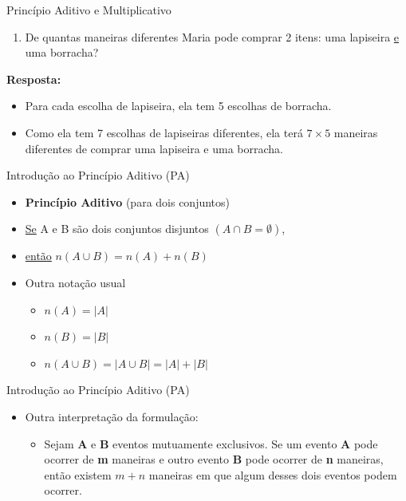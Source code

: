 \documentclass[aspectratio=169]{beamer}
\begin{document}
\begin{frame}{Princípio Aditivo e Multiplicativo}
     \begin{enumerate}[b]
        \item De quantas maneiras diferentes Maria pode comprar 2 itens: uma  lapiseira \underline{e} uma borracha?
    \end{enumerate}
    
    \vspace{4mm}
    \textbf{Resposta:}
    
    \begin{itemize}
        \item[] Para cada escolha de lapiseira, ela tem 5 escolhas de borracha.
        \item[] Como ela tem 7 escolhas de lapiseiras diferentes, ela terá $7 \times 5$ maneiras diferentes de comprar uma lapiseira e uma borracha.
    \end{itemize}
    
    \end{frame}

\begin{frame}{Introdução ao Princípio Aditivo (PA)}
    \begin{itemize}
        \item \textbf{Princípio Aditivo} (para dois conjuntos)
        \item[] \underline{Se} A e B são dois conjuntos disjuntos $(A \cap B = \emptyset)$,
        \item[] \underline{então} $n(A \cup B) = n(A) + n(B)$
    \end{itemize}

    \vspace{4mm}

    \begin{itemize}
        \item Outra notação usual
        \begin{itemize}
            \item[] $n(A) = |A|$
            \item[] $n(B) = |B|$
            \item[] $n(A \cup B) = |A \cup B| = |A| + |B| $
        \end{itemize}
    \end{itemize}
\end{frame}


\begin{frame}{Introdução ao Princípio Aditivo (PA)}
    \begin{itemize}
        \item Outra interpretação da formulação:
        \begin{itemize}
            \item Sejam \textbf{A} e \textbf{B} eventos mutuamente exclusivos. Se um evento \textbf{A} pode ocorrer de \textbf{m} maneiras e outro evento \textbf{B} pode ocorrer de \textbf{n} maneiras, então existem $m + n$ maneiras em que algum desses dois eventos podem ocorrer. 
        \end{itemize}
    \end{itemize}
\end{frame}
\end{document}
